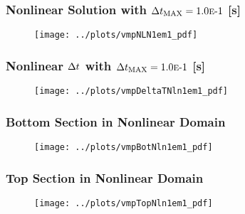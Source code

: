 \documentclass[compress,xcolor=table]{beamer}
\begin{document}
\begin{frame}
\frametitle{Nonlinear Solution with $\dtmax{} = \expneg{1.0}{1}$ [s]}

\begin{figure}[h!t]
\centering
\texttt{[image: ../plots/vmpNLN1em1\_pdf]}
\end{figure}

\end{frame}
\begin{frame}
\frametitle{Nonlinear $\dt{}$ with $\dtmax{} = \expneg{1.0}{1}$ [s]}

\begin{figure}[h!t]
\centering
\texttt{[image: ../plots/vmpDeltaTNln1em1\_pdf]}
\end{figure}

\end{frame}
\begin{frame}
\frametitle{Bottom Section in Nonlinear Domain}

\begin{figure}[h!t]
\centering
\texttt{[image: ../plots/vmpBotNln1em1\_pdf]}
\end{figure}

\end{frame}
\begin{frame}
\frametitle{Top Section in Nonlinear Domain}

\begin{figure}[h!t]
\centering
\texttt{[image: ../plots/vmpTopNln1em1\_pdf]}
\end{figure}

\end{frame}
\end{document}
